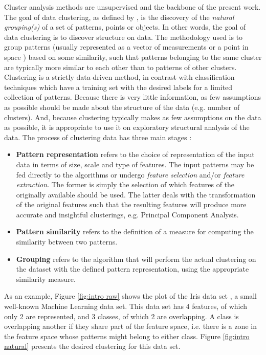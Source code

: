 Cluster analysis methods are unsupervised and the backbone of the present work.
The goal of data clustering, as defined by \cite{Jain2010}, is the discovery of the \textit{natural grouping(s)} of a set of patterns, points or objects.
In other words, the goal of data clustering is to discover structure on data.
The methodology used is to group patterns (usually represented as a vector of measurements or a point in space \cite{Jain1999}) based on some similarity, such that patterns belonging to the same cluster are typically more similar to each other than to patterns of other clusters.
Clustering is a strictly data-driven method, in contrast with classification techniques which have a training set with the desired labels for a limited collection of patterns.
Because there is very little information, as few assumptions as possible should be made about the structure of the data (e.g. number of clusters).
And, because clustering typically makes as few assumptions on the data as possible, it is appropriate to use it on exploratory structural analysis of the data.
The process of clustering data has three main stages \cite{Jain1999}:

\begin{itemize}
    \item \textbf{Pattern representation} refers to the choice of representation of the input data in terms of size, scale and type of features.
    The input patterns may be fed directly to the algorithms or undergo \emph{feature selection} and/or \emph{feature extraction}. The former is simply the selection of which features of the originally available should be used.
    The latter deals with the transformation of the original features such that the resulting features will produce more accurate and insightful clusterings, e.g. Principal Component Analysis.

    \item \textbf{Pattern similarity} refers to the definition of a measure for computing the similarity between two patterns.
    \item \textbf{Grouping} refers to the algorithm that will perform the actual clustering on the dataset with the defined pattern representation, using the appropriate similarity measure.
\end{itemize}

As an example, Figure \ref{fig:intro raw} shows the plot of the Iris data set \cite{anderson1936species,fisher1936use}, a small well-known Machine Learning data set.
This data set has 4 features, of which only 2 are represented, and 3 classes, of which 2 are overlapping.
A class is overlapping another if they share part of the feature space, i.e. there is a zone in the feature space whose patterns might belong to either class.
Figure \ref{fig:intro natural} presents the desired clustering for this data set.

